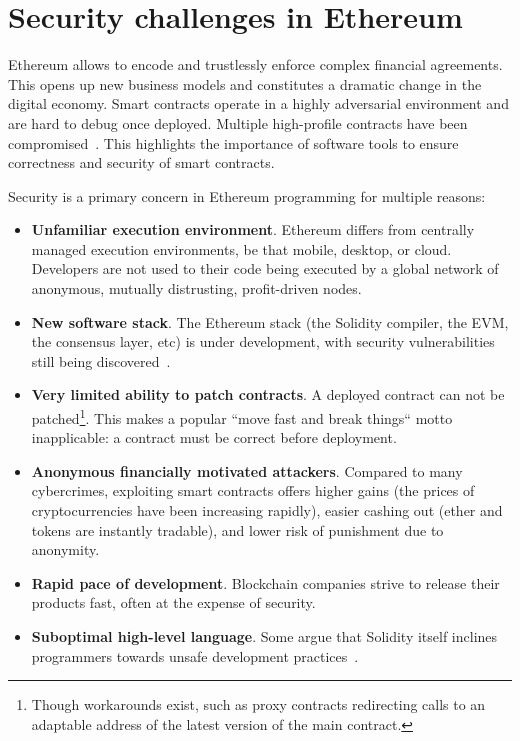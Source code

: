 
\section{Security challenges in Ethereum} \label{SecurityChallenges}

Ethereum allows to encode and trustlessly enforce complex financial agreements.
This opens up new business models and constitutes a dramatic change in the digital economy.
Smart contracts operate in a highly adversarial environment and are hard to debug once deployed.
Multiple high-profile contracts have been compromised~\cite{Sirer2016, Palladino2017}.
This highlights the importance of software tools to ensure correctness and security of smart contracts.

Security is a primary concern in Ethereum programming for multiple reasons:
\begin{itemize}
	\item \textbf{Unfamiliar execution environment}.
	Ethereum differs from centrally managed execution environments, be that mobile, desktop, or cloud.
	Developers are not used to their code being executed by a global network of anonymous, mutually distrusting, profit-driven nodes.
	\item \textbf{New software stack}.
	The Ethereum stack (the Solidity compiler, the EVM, the consensus layer, etc) is under development, with security vulnerabilities still being discovered~\cite{chriseth2017}.
	\item \textbf{Very limited ability to patch contracts}.
	A deployed contract can not be patched\footnote{Though workarounds exist, such as proxy contracts redirecting calls to an adaptable address of the latest version of the main contract.}.
	This makes a popular ``move fast and break things`` motto inapplicable: a contract must be correct before deployment.
	\item \textbf{Anonymous financially motivated attackers}.
	Compared to many cybercrimes, exploiting smart contracts offers higher gains (the prices of cryptocurrencies have been increasing rapidly), easier cashing out (ether and tokens are instantly tradable), and lower risk of punishment due to anonymity.
	\item \textbf{Rapid pace of development}.
	Blockchain companies strive to release their products fast, often at the expense of security.
	\item \textbf{Suboptimal high-level language}.
	Some argue that Solidity itself inclines programmers towards unsafe development practices~\cite{ydtm2016}.
\end{itemize}
